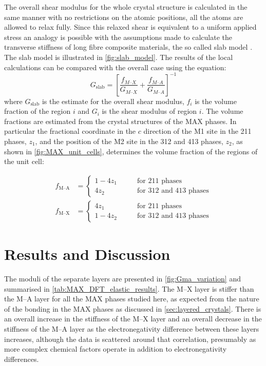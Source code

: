 

The overall shear modulus for the whole crystal structure is calculated in the same manner with no restrictions on the atomic positions, all the atoms are allowed to relax fully. Since this relaxed shear is equivalent to a uniform applied stress an analogy is possible with the assumptions made to calculate the transverse stiffness of long fibre composite materials, the so called slab model \cite{Hull1996ch4}. The slab model is illustrated in \autoref{fig:slab_model}. The results of the local calculations can be compared with the overall case using the equation:
\begin{equation}
G_{\text{slab}} = \left[ \frac{f_{M\text{--}X}}{G_{M\text{--}X}} + \frac{f_{M\text{--}A}}{G_{M\text{--}A}} \right]^{-1} \label{eqn:slab_model}
\end{equation}
where $G_{\text{slab}}$ is the estimate for the overall shear modulus, $f_i$ is the volume fraction of the region $i$ and $G_i$ is the shear modulus of region $i$. The volume fractions are estimated from the crystal structures of the MAX phases. In particular the fractional coordinate in the $c$ direction of the M1 site in the 211 phases, $z_1$, and the position of the M2 site in the 312 and 413 phases, $z_2$, as shown in \autoref{fig:MAX_unit_cells}, determines the volume fraction of the regions of the unit cell:

\begin{subequations}
\begin{align}
f_{\text{M--A}} &= 
\begin{cases}
1-4z_1 & \qquad \text{for 211 phases} \\
4z_2 & \qquad \text{for 312 and 413 phases}
\end{cases}  \\[1ex]
f_{\text{M--X}} &= 
\begin{cases}
4z_1 & \qquad \text{for 211 phases} \\
1 - 4z_2 & \qquad \text{for 312 and 413 phases}
\end{cases}
\end{align}
\end{subequations}

\section{Results and Discussion}

The moduli of the separate layers are presented in \autoref{fig:Gma_variation} and summarised in \autoref{tab:MAX_DFT_elastic_results}. The M--X layer is stiffer than the M--A layer for all the MAX phases studied here, as expected from the nature of the bonding in the MAX phases as discussed in \autoref{sec:layered_crystals}. There is an overall increase in the stiffness of the M--X layer and an overall decrease in the stiffness of the M--A layer as the electronegativity difference between these layers increases, although the data is scattered around that correlation, presumably as more complex chemical factors operate in addition to electronegativity differences.



